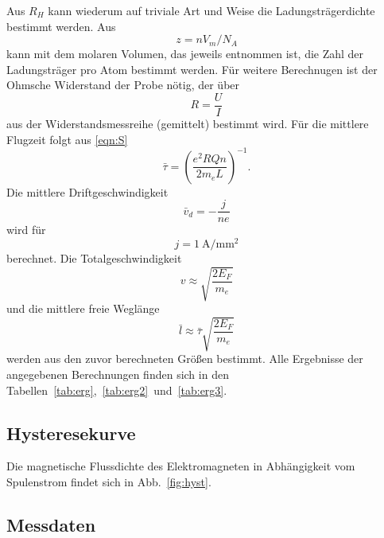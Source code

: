 Aus $R_H$ kann wiederum auf triviale Art und Weise die Ladungsträgerdichte bestimmt werden. Aus
\begin{equation}
  z = n  V_m / N_A
\end{equation}
kann mit dem molaren Volumen, das jeweils \cite{chemie.de} entnommen ist, die Zahl der Ladungsträger pro Atom bestimmt werden. Für weitere Berechnugen ist der Ohmsche Widerstand der Probe nötig, der über
\begin{equation}
  R = \frac{U}{I}
\end{equation}
aus der Widerstandsmessreihe (gemittelt) bestimmt wird. Für die mittlere Flugzeit folgt aus \eqref{eqn:S}
\begin{equation}
  \bar\tau = \left(\frac{e^2 R Q n}{2 m_e L}\right)^{-1}.
\end{equation}
Die mittlere Driftgeschwindigkeit
\begin{equation}
  \bar v_d = -\frac{j}{ne}
\end{equation}
wird für
\begin{equation}
  j = \SI{1}{\ampere\per\milli\meter\squared}
\end{equation}
berechnet.
Die Totalgeschwindigkeit
\begin{equation}
  v \approx \sqrt{\frac{2 E_F}{m_e}}
\end{equation}
und die mittlere freie Weglänge
\begin{equation}
  \bar l \approx \bar \tau \sqrt{\frac{2 E_F}{m_e}}
\end{equation}
werden aus den zuvor berechneten Größen bestimmt. Alle Ergebnisse der angegebenen Berechnungen finden sich in den Tabellen~\ref{tab:erg},~\ref{tab:erg2}~und~\ref{tab:erg3}.



\FloatBarrier
\subsection{Hysteresekurve}
Die magnetische Flussdichte des Elektromagneten in Abhängigkeit vom Spulenstrom findet sich in Abb.~\ref{fig:hyst}.

\FloatBarrier
\subsection{Messdaten}



